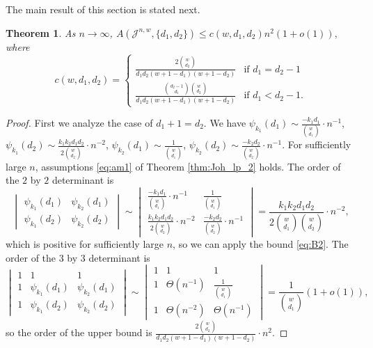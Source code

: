 \documentclass{amsart}
\newtheorem{theoremenv}[definitionenv]{Theorem}
\newenvironment{theorem}{\begin{theoremenv}\rm}{\end{theoremenv}}
\newcommand{\cJ}{\mathcal{J}}
\begin{document}
The main result of this section is stated next.
\begin{theorem}\label{thm:asymptotic_2-dist}
As $n \to \infty$, $
   A(\cJ^{n,w},\{d_1,d_2\})\le c(w,d_1,d_2)n^2(1+o(1)),$ where
  \begin{equation}\label{eq:cwd}
     c(w,d_1,d_2)=\begin{cases}
        \displaystyle \frac{2\binom{w}{d_2}}{d_1d_2(w+1-d_1)(w+1-d_2)}  &\text{if }d_1=d_2-1\\[.1in]
         \displaystyle  \frac{\binom{d_2-1}{d_1}\binom{w}{d_2}}{d_1d_2(w+1-d_1)(w+1-d_2)}&\text{if }d_1<d_2-1.
          \end{cases}
   \end{equation}
\end{theorem}
\begin{proof}
First we analyze the case of $d_1 + 1 = d_2.$ We have $\psi_{k_1}(d_1) \sim \frac{-k_1d_1}{\binom{w}{d_1}} \cdot n^{-1}$, $\psi_{k_1}(d_2) \sim \frac{k_1k_2d_1d_2}{2\binom{w}{d_2}} \cdot n^{-2}$, $\psi_{k_2}(d_1) \sim \frac{1}{\binom{w}{d_1}}$, $\psi_{k_2}(d_2) \sim \frac{-k_2d_2}{\binom{w}{d_2}} \cdot n^{-1}$. For sufficiently large $n$, assumptions \eqref{eq:am1} of Theorem \ref{thm:Joh_lp_2} holds. The order of the $2$ by $2$ determinant is
    \begin{equation*}
        \begin{vmatrix} \psi_{k_1}(d_1) & \psi_{k_2}(d_1) \\ \psi_{k_1}(d_2) & \psi_{k_2}(d_2) \end{vmatrix} \sim \begin{vmatrix}
            \frac{-k_1d_1}{\binom{w}{d_1}} \cdot n^{-1} & \frac{1}{\binom{w}{d_1}} \\
            \frac{k_1k_2d_1d_2}{2\binom{w}{d_2}} \cdot n^{-2} & \frac{-k_2d_2}{\binom{w}{d_2}} \cdot n^{-1}
        \end{vmatrix} = \frac{k_1k_2d_1d_2}{2\binom{w}{d_1}\binom{w}{d_2}} \cdot n^{-2},
    \end{equation*}
    which is positive for sufficiently large $n$, so we can apply the bound \eqref{eq:B2}. The order of the $3$ by $3$ determinant is
    \begin{equation*}
        \begin{vmatrix} 1 & 1 & 1 \\ 1 & \psi_{k_1}(d_1) & \psi_{k_2}(d_1) \\ 1 & \psi_{k_1}(d_2) & \psi_{k_2}(d_2) \end{vmatrix} \sim \begin{vmatrix} 1 & 1 & 1 \\ 1 & \Theta(n^{-1}) & \frac{1}{\binom{w}{d_1}} \\ 1 & \Theta(n^{-2}) & \Theta(n^{-1}) \end{vmatrix} = \frac{1}{\binom{w}{d_1}} (1+o(1)),
    \end{equation*}
    so the order of the upper bound is $\frac{2\binom{w}{d_2}}{d_1d_2(w+1-d_1)(w+1-d_2)} \cdot n^2$.


\end{proof}
\end{document}
